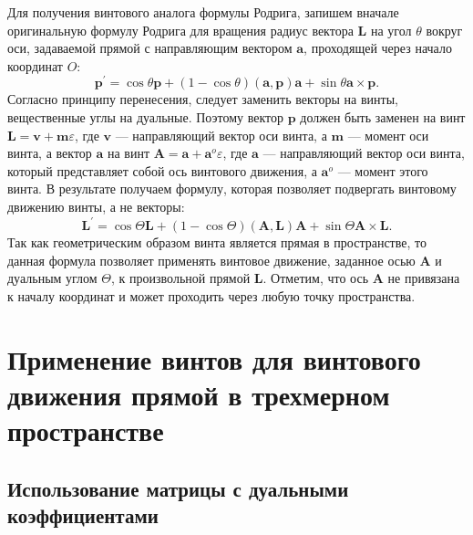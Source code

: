 \documentclass[%
]{ittmm}
\begin{document}
Для получения винтового аналога формулы Родрига, запишем вначале оригинальную формулу Родрига для вращения радиус вектора $\mathbf{L}$ на угол $\theta$ вокруг оси, задаваемой прямой с направляющим вектором $\mathbf{a}$, проходящей через начало координат $O$:
\begin{equation*}
  \mathbf{p}^\prime = \cos\theta \mathbf{p} + (1 - \cos\theta) (\mathbf{a}, \mathbf{p})\mathbf{a} + \sin\theta \mathbf{a}\times\mathbf{p}.
\end{equation*}
Согласно принципу перенесения, следует заменить векторы на винты, вещественные углы на дуальные. Поэтому вектор $\mathbf{p}$ должен быть заменен на винт $\mathbf{L} = \mathbf{v} + \mathbf{m} \varepsilon$, где $\mathbf{v}$ — направляющий вектор оси винта, а $\mathbf{m}$ — момент оси винта, а вектор $\mathbf{a}$ на винт $\mathbf{A} = \mathbf{a} + \mathbf{a}^o \varepsilon$, где $\mathbf{a}$ — направляющий вектор оси винта, который представляет собой ось винтового движения, а $\mathbf{a}^o$ — момент этого винта. В результате получаем формулу, которая позволяет подвергать винтовому движению винты, а не векторы:
\begin{equation*}
  \mathbf{L}^\prime = \cos\Theta \mathbf{L} + (1 - \cos\Theta) (\mathbf{A}, \mathbf{L})\mathbf{A} + \sin\Theta \mathbf{A}\times\mathbf{L}.
\end{equation*}
Так как геометрическим образом винта является прямая в пространстве, то данная формула позволяет применять винтовое движение, заданное осью $\mathbf{A}$ и дуальным углом $\Theta$, к произвольной прямой $\mathbf{L}$. Отметим, что ось $\mathbf{A}$ не привязана к началу координат и может проходить через любую точку пространства.

\section{Применение винтов для винтового движения прямой в трехмерном пространстве}

\subsection{Использование матрицы с дуальными коэффициентами}
\end{document}
